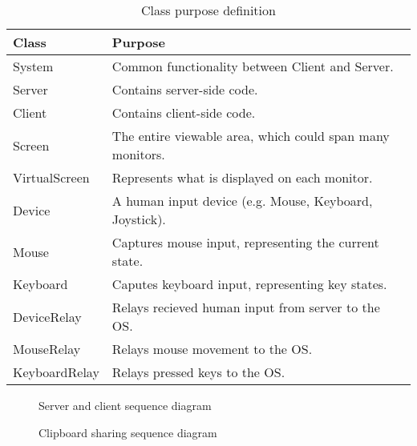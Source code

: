 \begin{table}[ht!]
  \begin{tabular}{|l|l|}
    \hline
    \textbf{Class} & \textbf{Purpose} \\
    \hline
    System & Common functionality between Client and Server. \\
    Server & Contains server-side code. \\
    Client & Contains client-side code. \\
    Screen & The entire viewable area, which could span many monitors. \\
    VirtualScreen & Represents what is displayed on each monitor. \\
    Device & A human input device (e.g. Mouse, Keyboard, Joystick). \\
    Mouse & Captures mouse input, representing the current state. \\
    Keyboard & Caputes keyboard input, representing key states. \\
    DeviceRelay & Relays recieved human input from server to the OS. \\
    MouseRelay & Relays mouse movement to the OS. \\
    KeyboardRelay & Relays pressed keys to the OS. \\
    \hline
  \end{tabular}
  \caption{Class purpose definition}
  \label{tab:classes}
\end{table}

\begin{figure}
  \centering
  
  \caption{Server and client sequence diagram}
\end{figure}

\begin{figure}
  \centering
  
  \caption{Clipboard sharing sequence diagram}
\end{figure}
